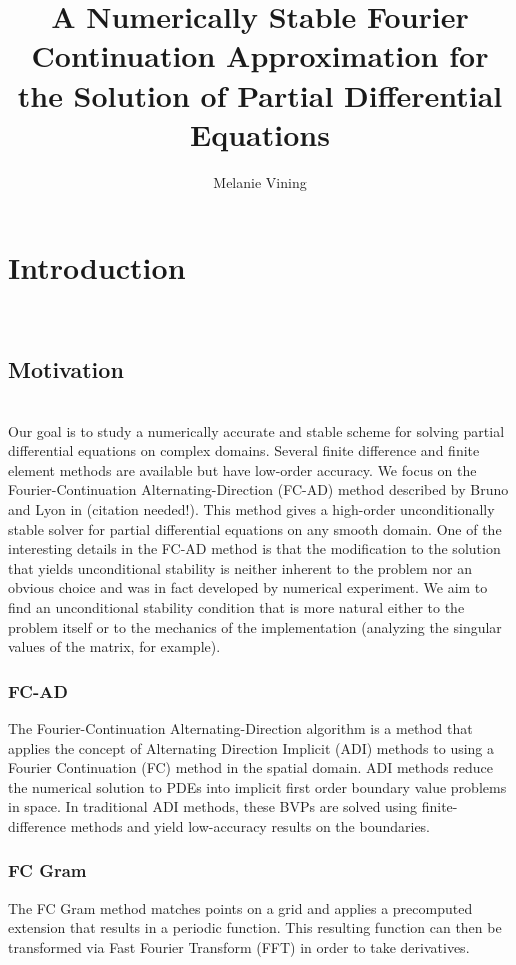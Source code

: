 \documentclass[11pt]{amsart}
\title{A Numerically Stable Fourier Continuation Approximation for the Solution of Partial Differential Equations}
\author{Melanie Vining}
\begin{document}
\maketitle
\section{Introduction} \\
\subsection{Motivation} \\
Our goal is to study a numerically accurate and stable scheme for solving partial differential equations on complex domains.  Several finite difference and finite element methods are available but have low-order accuracy.  We focus on the Fourier-Continuation Alternating-Direction (FC-AD)  method described by Bruno and Lyon in (citation needed!). This method gives a high-order unconditionally stable solver for partial differential equations on any smooth domain.  One of the interesting details in the FC-AD method is that the modification to the solution that yields unconditional stability is neither inherent to the problem nor an obvious choice and was in fact developed by numerical experiment.  We aim to find an unconditional stability condition that is more natural either to the problem itself or to the mechanics of the implementation (analyzing the singular values of the matrix, for example).  
\subsubsection{FC-AD}
The Fourier-Continuation Alternating-Direction algorithm is a method that applies the concept of Alternating Direction Implicit (ADI) methods to using a Fourier Continuation (FC) method in the spatial domain.  ADI methods reduce the numerical solution to PDEs into implicit first order boundary value problems in space.  In traditional ADI methods, these  BVPs are solved using finite-difference methods and yield low-accuracy results on the boundaries.  

\subsubsection{FC Gram}
The FC Gram method matches points on a grid and applies a precomputed extension that results in a periodic function.  This resulting function can then be transformed via Fast Fourier Transform (FFT) in order to take derivatives.
\end{document}

